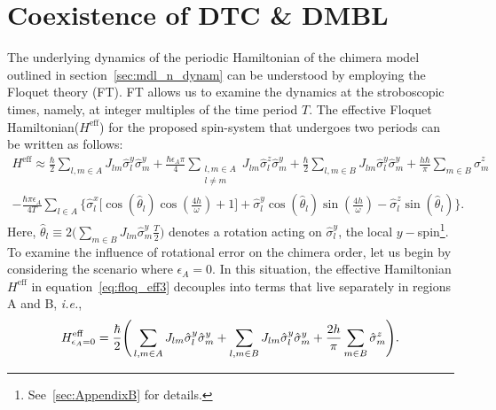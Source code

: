 \documentclass[12pt]{iopart}
\begin{document}
\section{\label{sec:level3}Coexistence of DTC \& DMBL}	
The underlying dynamics of the periodic Hamiltonian of the chimera model outlined in section~\ref{sec:mdl_n_dynam} can be understood by employing the Floquet theory (FT). FT allows us to examine the dynamics at the stroboscopic times, namely, at integer multiples of the time period $T$. The effective Floquet Hamiltonian($H^{\mathrm{eff}}$) for the proposed spin-system that undergoes two periods can be written as follows:
\begin{multline}
    H^{\mathrm{eff}} \approx\frac{\hbar}{2} \sum_{l,m\in A}J_{lm}\hat{\sigma}_l^y\hat{\sigma}_m^y +\frac{\hbar \epsilon_A \pi}{4} \sum_{\substack{l,m\in A\\l\neq m}} J_{lm}\hat{\sigma}^z_l\hat{\sigma}^y_m + \frac{\hbar}{2}\sum_{l,m\in B}J_{lm}\hat{\sigma}_l^y \hat{\sigma}_m^y + \frac{h\hbar}{\pi}\sum_{m \in B}\hat{\sigma}^z_m \\ -\frac{\hbar \pi \epsilon_A}{4T}\sum_{l\in A}\Bigg\{\hat{\sigma}^x_l \bigg[\cos(\hat{\theta}_l)\cos(\frac{4h}{\omega})+1 \bigg] + \hat{\sigma}^y_l \cos(\hat{\theta}_l)\sin(\frac{4h}{\omega})-\hat{\sigma}^z_l \sin(\hat{\theta}_l)\Bigg\}.
    \label{eq:floq_eff3}
\end{multline}
Here, $\displaystyle \hat{\theta}_l \equiv 2 \Big(\sum_{m \in B}J_{lm}\hat{\sigma}^y_m \frac{T}{2} \Big)$ denotes a rotation acting on $\hat{\sigma}^y_l$, the local $y-$spin\footnote{See~\ref{sec:AppendixB} for details.}. 
To examine the influence of rotational error on the chimera order, let us begin by considering the scenario where $\epsilon_A=0$. In this situation, the effective Hamiltonian $H^\mathrm{eff}$ in equation~\eqref{eq:floq_eff3}  decouples into terms that live separately in regions A and B, \textit{i.e.},
\begin{equation}
    H^{\mathrm{eff}}_{\epsilon_A=0} =  \frac{\hbar}{2}\Bigg( \sum_{l,m\in A} J_{lm} \hat{\sigma}^y_l\hat{\sigma}^y_m +\sum_{l,m\in B} J_{lm} \hat{\sigma}^y_l\hat{\sigma}^y_m\\+\frac{2h }{\pi}\sum_{m \in B}\hat{\sigma}^z_m\Bigg).
\end{equation}
	
\end{document}
